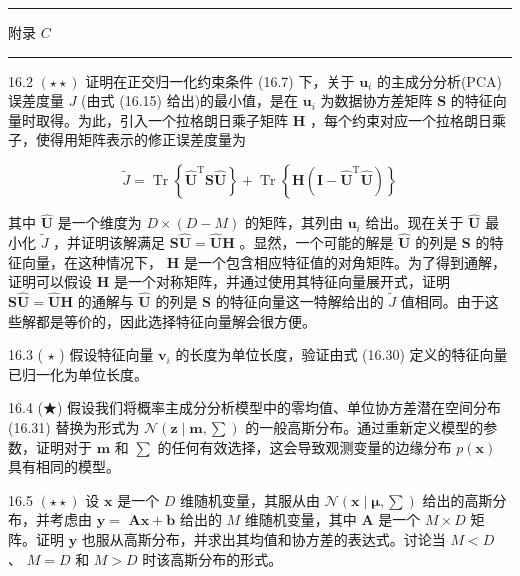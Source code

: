 \documentclass[10pt]{report}
\newcommand{\HRule}{\begin{center}\rule{0.9\linewidth}{0.2mm}\end{center}}
\begin{document}
\HRule

附录 \(C\)

\HRule

16.2 \(\left( {\star  \star  }\right)\) 证明在正交归一化约束条件 (16.7) 下，关于 \({\mathbf{u}}_{i}\) 的主成分分析(PCA)误差度量 \(J\) (由式 (16.15) 给出)的最小值，是在 \({\mathbf{u}}_{i}\) 为数据协方差矩阵 \(\mathbf{S}\) 的特征向量时取得。为此，引入一个拉格朗日乘子矩阵 \(\mathbf{H}\) ，每个约束对应一个拉格朗日乘子，使得用矩阵表示的修正误差度量为

\[
\widetilde{J} = \operatorname{Tr}\left\{  {{\widehat{\mathbf{U}}}^{\mathrm{T}}\mathbf{S}\widehat{\mathbf{U}}}\right\}   + \operatorname{Tr}\left\{  {\mathbf{H}\left( {\mathbf{I} - {\widehat{\mathbf{U}}}^{\mathrm{T}}\widehat{\mathbf{U}}}\right) }\right\}   \tag{16.87}
\]

其中 \(\widehat{\mathbf{U}}\) 是一个维度为 \(D \times  \left( {D - M}\right)\) 的矩阵，其列由 \({\mathbf{u}}_{i}\) 给出。现在关于 \(\widehat{\mathbf{U}}\) 最小化 \(\widetilde{J}\) ，并证明该解满足 \(\mathbf{S}\widehat{\mathbf{U}} = \widehat{\mathbf{U}}\mathbf{H}\) 。显然，一个可能的解是 \(\widehat{\mathbf{U}}\) 的列是 \(\mathbf{S}\) 的特征向量，在这种情况下， \(\mathbf{H}\) 是一个包含相应特征值的对角矩阵。为了得到通解，证明可以假设 \(\mathbf{H}\) 是一个对称矩阵，并通过使用其特征向量展开式，证明 \(\mathbf{S}\widehat{\mathbf{U}} = \widehat{\mathbf{U}}\mathbf{H}\) 的通解与 \(\widehat{\mathbf{U}}\) 的列是 \(\mathbf{S}\) 的特征向量这一特解给出的 \(\widetilde{J}\) 值相同。由于这些解都是等价的，因此选择特征向量解会很方便。

16.3 ( \(\star\) ) 假设特征向量 \({\mathbf{v}}_{i}\) 的长度为单位长度，验证由式 (16.30) 定义的特征向量已归一化为单位长度。

16.4 (★) 假设我们将概率主成分分析模型中的零均值、单位协方差潜在空间分布 (16.31) 替换为形式为 \(\mathcal{N}\left( {\mathbf{z} \mid  \mathbf{m},\mathbf{\sum }}\right)\) 的一般高斯分布。通过重新定义模型的参数，证明对于 \(\mathbf{m}\) 和 \(\mathbf{\sum }\) 的任何有效选择，这会导致观测变量的边缘分布 \(p\left( \mathbf{x}\right)\) 具有相同的模型。

16.5 \(\left( {\star  \star  }\right)\) 设 \(\mathbf{x}\) 是一个 \(D\) 维随机变量，其服从由 \(\mathcal{N}\left( {\mathbf{x} \mid  \mathbf{\mu },\mathbf{\sum }}\right)\) 给出的高斯分布，并考虑由 \(\mathbf{y} =\)  \(\mathbf{{Ax}} + \mathbf{b}\) 给出的 \(M\) 维随机变量，其中 \(\mathbf{A}\) 是一个 \(M \times  D\) 矩阵。证明 \(\mathbf{y}\) 也服从高斯分布，并求出其均值和协方差的表达式。讨论当 \(M < D\) 、 \(M = D\) 和 \(M > D\) 时该高斯分布的形式。
\end{document}
